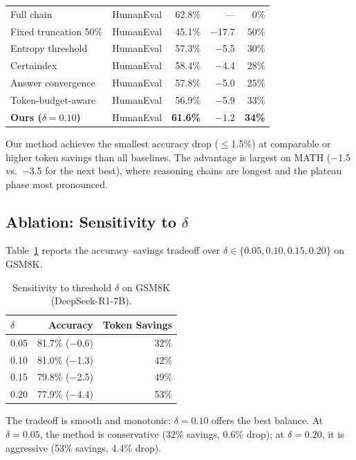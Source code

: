 \documentclass{article}
\begin{document}
\begin{table}[t]
\begin{tabular}{llrrr}
    \midrule
    Full chain & HumanEval & 62.8\% & --- & 0\% \\
    Fixed truncation 50\% & HumanEval & 45.1\% & $-$17.7 & 50\% \\
    Entropy threshold & HumanEval & 57.3\% & $-$5.5 & 30\% \\
    Certaindex & HumanEval & 58.4\% & $-$4.4 & 28\% \\
    Answer convergence & HumanEval & 57.8\% & $-$5.0 & 25\% \\
    Token-budget-aware & HumanEval & 56.9\% & $-$5.9 & 33\% \\
    \textbf{Ours ($\delta\!=\!0.10$)} & HumanEval & \textbf{61.6\%} & $\mathbf{-1.2}$ & \textbf{34\%} \\
    \bottomrule
  \end{tabular}
\end{table}

Our method achieves the smallest accuracy drop ($\leq$1.5\%) at comparable or higher token savings than all baselines. The advantage is largest on MATH ($-$1.5 vs.\ $-$3.5 for the next best), where reasoning chains are longest and the plateau phase most pronounced.

\subsection{Ablation: Sensitivity to $\delta$}

Table~\ref{tab:ablation} reports the accuracy--savings tradeoff over $\delta \in \{0.05, 0.10, 0.15, 0.20\}$ on GSM8K.

\begin{table}[h]
  \caption{Sensitivity to threshold $\delta$ on GSM8K (DeepSeek-R1-7B).}
  \label{tab:ablation}
  \centering
  \small
  \begin{tabular}{lrr}
    \toprule
    $\delta$ & Accuracy & Token Savings \\
    \midrule
    0.05 & 81.7\% ($-$0.6) & 32\% \\
    0.10 & 81.0\% ($-$1.3) & 42\% \\
    0.15 & 79.8\% ($-$2.5) & 49\% \\
    0.20 & 77.9\% ($-$4.4) & 53\% \\
    \bottomrule
  \end{tabular}
\end{table}

The tradeoff is smooth and monotonic: $\delta = 0.10$ offers the best balance. At $\delta = 0.05$, the method is conservative (32\% savings, 0.6\% drop); at $\delta = 0.20$, it is aggressive (53\% savings, 4.4\% drop).
\end{document}
